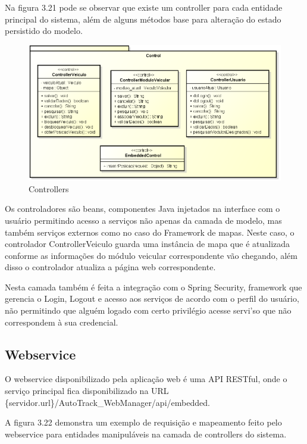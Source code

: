Na figura 3.21 pode se observar que existe um controller para cada entidade principal do sistema, além de alguns métodos base para alteração do estado persistido do modelo.

\begin{figure}[!htb]
	\centering
	\includegraphics[width=\textwidth]{figures/webm_control.png}
	\caption{Controllers}
	\label{}
\end{figure}

Os controladores são beans, componentes Java injetados na interface com o usuário permitindo acesso a serviços não apenas da camada de modelo, mas também serviços externos como no caso do Framework de mapas. Neste caso, o controlador ControllerVeiculo guarda uma instância de mapa que é atualizada conforme as informações do módulo veicular correspondente vão chegando, além disso o controlador atualiza a página web correspondente.

Nesta camada também é feita a integração com o Spring Security, framework que gerencia o Login, Logout e acesso aos serviços de acordo com o perfil do usuário, não permitindo que alguém logado com certo privilégio acesse servi'so que não correspondem à sua credencial.

\newpage

\subsection {Webservice}

O webservice disponibilizado pela aplicação web é uma API RESTful, onde o serviço principal fica disponibilizado na URL \{servidor.url\}/AutoTrack\_WebManager/api/embedded. 

A figura 3.22 demonstra um exemplo de requisição e mapeamento feito pelo webservice para entidades manipuláveis na camada de controllers do sistema.

